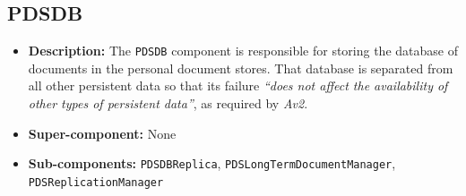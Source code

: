 \documentclass[a4paper,10pt]{article}
\begin{document}
\subsection{PDSDB}
\begin{itemize}
    \item \textbf{Description:} The \texttt{PDSDB} component is responsible for storing the database of documents in the personal document stores.  That database is separated from all other persistent data so that its failure \emph{``does not affect the availability of other types of persistent data''}, as required by \emph{Av2}.
    \item \textbf{Super-component:} None
    \item \textbf{Sub-components:} \texttt{PDSDBReplica}, \texttt{PDSLongTermDocumentManager}, \texttt{PDSReplicationManager}
\end{itemize}
\end{document}
